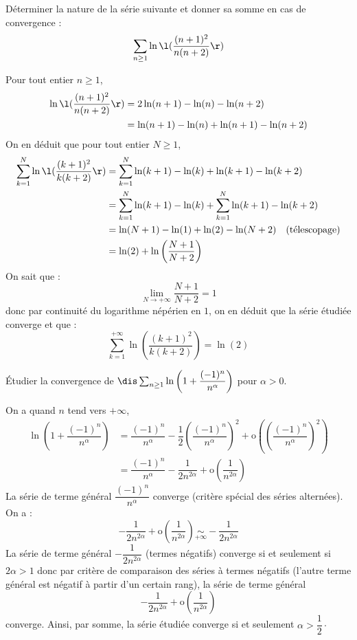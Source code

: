 \documentclass[a4paper,10pt]{report}
\begin{document}
\everymath{\displaystyle}

\begin{center}
\end{center}

\bigskip

\begin{Exa} Déterminer la nature de la série suivante et donner sa somme en cas de convergence : 
$$ \sum_{n \geq 1} \ln \l( \frac{(n+1)^2}{n(n+2)}\r)$$
\end{Exa}

\corr Pour tout entier $n \geq 1$,
\begin{align*}
\ln \l( \frac{(n+1)^2}{n(n+2)}\r) & = 2\ln(n+1)- \ln(n)- \ln(n+2) \\
& = \ln(n+1)-\ln(n) + \ln(n+1)-\ln(n+2)
\end{align*}
On en déduit que pour tout entier $N \geq 1$,
\begin{align*}
\sum_{k=1}^N \ln \l( \frac{(k+1)^2}{k(k+2)}\r) &= \sum_{k=1}^N \ln(k+1)-\ln(k) + \ln(k+1)-\ln(k+2) \\
& = \sum_{k=1}^N \ln(k+1)-\ln(k) + \sum_{k=1}^N \ln(k+1)-\ln(k+2) \\
& = \ln(N+1) - \ln(1) + \ln(2)- \ln(N+2) \quad \hbox{(télescopage)} \\
& = \ln(2) + \ln \left( \dfrac{N+1}{N+2} \right)
\end{align*}
On sait que :
$$ \lim_{N \rightarrow + \infty} \dfrac{N+1}{N+2}=1$$
donc par continuité du logarithme népérien en $1$, on en déduit que la série étudiée converge et que :
$$ \sum_{k=1}^{+ \infty} \ln \left( \dfrac{(k+1)^2}{k(k+2)} \right) = \ln(2) $$


\begin{Exa} Étudier la convergence de $\dis \sum_{n \geq 1} \ln \left( 1 + \dfrac{(-1)^n}{n^{\alpha}} \right)$ pour $\alpha>0$.
\end{Exa} 

\corr On a quand $n$ tend vers $+ \infty$,
\begin{align*}
 \ln \left( 1 + \dfrac{(-1)^n}{n^{\alpha}} \right) & = \dfrac{(-1)^n}{n^{\alpha}} - \dfrac{1}{2} \left(\dfrac{(-1)^n}{n^{\alpha}} \right)^2 + \textrm{o} \left(\left(\dfrac{(-1)^n}{n^{\alpha}} \right)^2\right) \\
 & = \dfrac{(-1)^n}{n^{\alpha}} - \dfrac{1}{2n^{2\alpha}} +  \textrm{o} \left( \dfrac{1}{n^{2 \alpha}} \right)
 \end{align*}
 La série de terme général $\dfrac{(-1)^n}{n^{\alpha}}$ converge (critère spécial des séries alternées). On a :
 $$  - \dfrac{1}{2n^{2\alpha}} +  \textrm{o} \left( \dfrac{1}{n^{2 \alpha}} \right) \underset{+\infty}{\sim}  - \dfrac{1}{2n^{2\alpha}}$$
 La série de terme général $- \dfrac{1}{2n^{2\alpha}}$ (termes négatifs) converge si et seulement si $2 \alpha>1$ donc par critère de comparaison des séries à termes négatifs (l'autre terme général est négatif à partir d'un certain rang), la série de terme général 
$$  - \dfrac{1}{2n^{2\alpha}} +  \textrm{o} \left( \dfrac{1}{n^{2 \alpha}} \right)$$
converge. Ainsi, par somme, la série étudiée converge si et seulement $\alpha > \dfrac{1}{2} \cdot$
\end{document}

